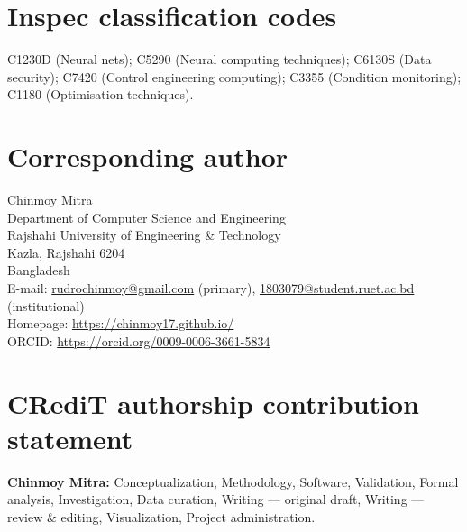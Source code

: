 \documentclass[a4paper,fleqn]{cas-sc}
\begin{document}
\section*{Inspec classification codes}
C1230D (Neural nets); C5290 (Neural computing techniques);
C6130S (Data security); C7420 (Control engineering computing);
C3355 (Condition monitoring); C1180 (Optimisation techniques).

\section*{Corresponding author}
\noindent
Chinmoy Mitra\\
Department of Computer Science and Engineering\\
Rajshahi University of Engineering \& Technology\\
Kazla, Rajshahi 6204\\
Bangladesh\\[4pt]
E-mail: \href{mailto:rudrochinmoy@gmail.com}{rudrochinmoy@gmail.com}
(primary),
\href{mailto:1803079@student.ruet.ac.bd}{1803079@student.ruet.ac.bd}
(institutional)\\
Homepage: \url{https://chinmoy17.github.io/}\\
ORCID: \url{https://orcid.org/0009-0006-3661-5834}

\section*{CRediT authorship contribution statement}
\textbf{Chinmoy Mitra:} Conceptualization, Methodology, Software,
Validation, Formal analysis, Investigation, Data curation,
Writing --- original draft, Writing --- review \& editing,
Visualization, Project administration.

\end{document}
